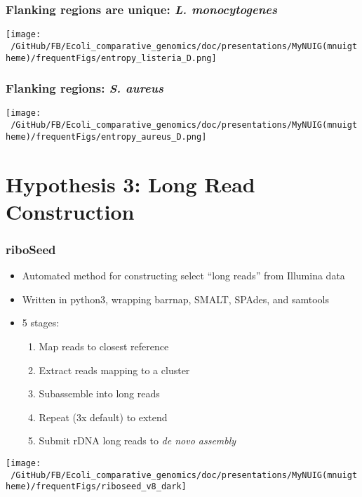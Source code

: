 \documentclass[10pt, compress]{beamer}
\begin{document}
\begin{frame}[fragile]
  \frametitle{Flanking regions are unique: \textit{L. monocytogenes}}
  \hspace*{-1cm}
  \texttt{[image: ~/GitHub/FB/Ecoli\_comparative\_genomics/doc/presentations/MyNUIG(mnuigtheme)/frequentFigs/entropy\_listeria\_D.png]}
\end{frame}

\begin{frame}[fragile]
  \frametitle{Flanking regions: \textit{S. aureus}}
  \hspace*{-1cm}
  \texttt{[image: ~/GitHub/FB/Ecoli\_comparative\_genomics/doc/presentations/MyNUIG(mnuigtheme)/frequentFigs/entropy\_aureus\_D.png]}
\end{frame}


\section{Hypothesis 3: Long Read Construction}

\begin{frame}[fragile]
  \frametitle{riboSeed}
  \begin{itemize}
  \item Automated method for constructing select ``long reads'' from Illumina data
  \item Written in python3, wrapping barrnap, SMALT, SPAdes, and samtools
  \item 5 stages:
  \begin{enumerate}
    \item Map reads to closest reference
    \item Extract reads mapping to a cluster
    \item Subassemble into long reads
    \item Repeat (3x default) to extend
    \item Submit rDNA long reads to \textit{de novo assembly}

  \end{enumerate}
  \end{itemize}

\end{frame}

\begin{frame}[fragile]
  \vskip -0mm
  \hspace*{-8mm}\texttt{[image: ~/GitHub/FB/Ecoli\_comparative\_genomics/doc/presentations/MyNUIG(mnuigtheme)/frequentFigs/riboseed\_v8\_dark]}
\end{frame}
\end{document}

